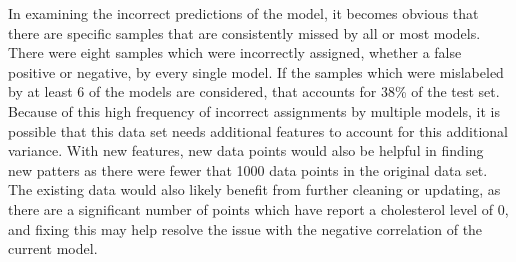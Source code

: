 \documentclass[12pt]{article}
\begin{document}

In examining the incorrect predictions of the model, it becomes obvious that there are 
specific samples that are consistently missed by all or most models. There were eight 
samples which were incorrectly assigned, whether a false positive or negative, by every 
single model. If the samples which were mislabeled by at least 6 of the models are 
considered, that accounts for 38\% of the test set. Because of this high frequency of 
incorrect assignments by multiple models, it is possible that this data set needs 
additional features to account for this additional variance. With new features, new data 
points would also be helpful in finding new patters as there were fewer that 1000 data 
points in the original data set. The existing data would also likely benefit from further 
cleaning or updating, as there are a significant number of points which have report a 
cholesterol level of 0, and fixing this may help resolve the issue with the negative 
correlation of the current model.
\end{document}
